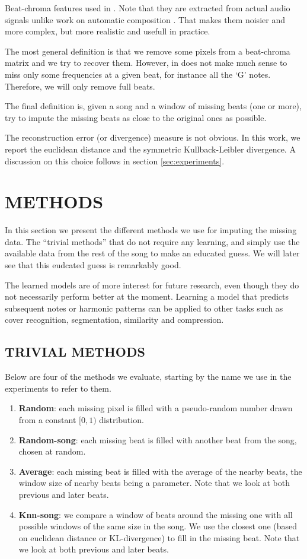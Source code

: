 \documentclass{article}
\begin{document}
Beat-chroma features used in \cite{Ellis2007a}.
Note that they are extracted from actual audio signals unlike work on automatic composition
\cite{Eck2002d}. That makes them noisier and more complex, but more realistic and usefull
in practice.

The most general definition is that we remove some pixels from a beat-chroma matrix and
we try to recover them. However, in does not make much sense to miss only some frequencies
at a given beat, for instance all the `G' notes. Therefore, we will only remove full
beats.

The final definition is, given a song and a window of missing beats (one or more),
try to impute the missing beats as close to the original ones as possible.

The reconstruction error (or divergence) measure is not obvious. In this work,
we report the euclidean distance and the symmetric Kullback-Leibler divergence.
A discussion on this choice follows in section \ref{sec:experiments}.


\section{METHODS}
\label{sec:methods}
In this section we present the different methods we use for imputing the missing data.
The ``trivial methods'' that do not require any learning, and simply use the available
data from the rest of the song to make an educated guess. We will later see that this
eudcated guess is remarkably good.

The learned models are of more interest for future research, even though they do not
necessarily perform better at the moment. Learning a model that predicts subsequent
notes or harmonic patterns can be applied to other tasks such as cover recognition,
segmentation, similarity and compression.

\subsection{TRIVIAL METHODS}
\label{ssec:trivialmethods}
Below are four of the methods we evaluate, starting by the name we use in the experiments
to refer to them.
\begin{enumerate}
\item \textbf{Random}: each missing pixel is filled with a pseudo-random number drawn from
a constant $[0,1)$ distribution.
\item \textbf{Random-song}: each missing beat is filled with another beat from the song,
chosen at random.
\item \textbf{Average}: each missing beat is filled with the average of the nearby beats,
the window size of nearby beats being a parameter. Note that we look at both previous and
later beats.
\item \textbf{Knn-song}: we compare a window of beats around the missing one with
all possible windows of the same size in the song. We use the closest one (based on euclidean
distance or KL-divergence) to fill in the missing beat. Note that we look at both
previous and later beats.
\end{enumerate}
\end{document}
